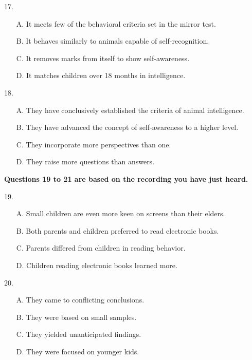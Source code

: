 \documentclass[UTF8,11pt]{ctexart}
\begin{document}
17.


\begin{itemize}[leftmargin=2em,itemsep=.2em,topsep=.4em]\item[A.] It meets few of the behavioral criteria set in the mirror test.
\item[B.] It behaves similarly to animals capable of self-recognition.
\item[C.] It removes marks from itself to show self-awareness.
\item[D.] It matches children over 18 months in intelligence.
\end{itemize}

18.


\begin{itemize}[leftmargin=2em,itemsep=.2em,topsep=.4em]\item[A.] They have conclusively established the criteria of animal intelligence.
\item[B.] They have advanced the concept of self-awareness to a higher level.
\item[C.] They incorporate more perspectives than one.
\item[D.] They raise more questions than answers.
\end{itemize}

\textbf{Questions 19 to 21 are based on the recording you have just heard.}


19.


\begin{itemize}[leftmargin=2em,itemsep=.2em,topsep=.4em]\item[A.] Small children are even more keen on screens than their elders.
\item[B.] Both parents and children preferred to read electronic books.
\item[C.] Parents differed from children in reading behavior.
\item[D.] Children reading electronic books learned more.
\end{itemize}

20.


\begin{itemize}[leftmargin=2em,itemsep=.2em,topsep=.4em]\item[A.] They came to conflicting conclusions.
\item[B.] They were based on small samples.
\item[C.] They yielded unanticipated findings.
\item[D.] They were focused on younger kids.
\end{itemize}
\end{document}
